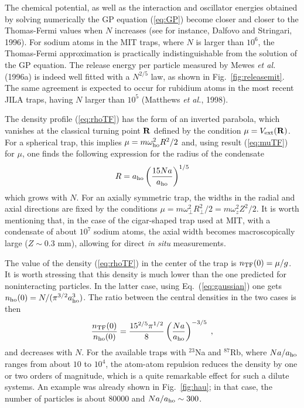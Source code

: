 The chemical potential, as well as the interaction and oscillator
energies obtained by solving numerically the GP equation (\ref{eq:GP})
become closer and closer to the Thomas-Fermi values when $N$
increases (see for instance, Dalfovo and Stringari, 1996). For 
sodium atoms in the MIT traps, where $N$ is larger than $10^6$,
the Thomas-Fermi approximation is practically indistinguishable
from the solution of the GP equation. The release energy per 
particle measured by Mewes {\it et al.} (1996a) is indeed well 
fitted with a $N^{2/5}$ law, as shown in Fig.~\ref{fig:releasemit}. 
The same agreement is expected to occur for rubidium atoms in the 
most recent JILA traps, having $N$ larger than $10^5$ (Matthews 
{\it et al.}, 1998). 

The density profile (\ref{eq:rhoTF}) has the form of an inverted 
parabola, which vanishes at the classical turning point ${\bf R}$
defined by the condition $\mu=V_{\rm ext}({\bf R})$. For a spherical
trap, this implies $\mu=m \omega_{\rm ho}^2 R^2/2$ and, using result
(\ref{eq:muTF}) for $\mu$, one finds the
following expression for the radius of the condensate
\begin{equation}
R = a_{\rm ho} \left( { 15 N a \over a_{\rm ho} } \right)^{1/5}
\label{eq:capitalr}
\end{equation}
which grows with $N$. For an axially symmetric trap, the widths in
the radial and axial directions are fixed by the conditions
$\mu=m\omega_\perp^2 R_\perp^2/2=m\omega_z^2 Z^2/2$. It is worth
mentioning that, in the case of the cigar-shaped trap used at MIT,
with a condensate of about  $10^7$ sodium atoms, the axial width
becomes  macroscopically large ($Z\sim 0.3$ mm), allowing
for direct {\it in situ} measurements.  

The value of the density (\ref{eq:rhoTF}) in the center of the trap
is $n_{\rm TF} (0) = \mu/g$. It is worth stressing that this density is much
lower than the one predicted for noninteracting particles. In the
latter case, using Eq.~(\ref{eq:gaussian}) one gets $n_{\rm ho}(0)=
N/(\pi^{3/2} a_{\rm ho}^3)$. The ratio between the central densities in
the two cases is then
\begin{equation}
{ n_{\rm TF} (0) \over n_{\rm ho} (0) } = {15^{2/5} \pi^{1/2} \over 8 }
\left( {N a \over a_{\rm ho} } \right)^{-3/5} \; ,
\label{eq:ration0}
\end{equation}
and decreases with $N$. For the available traps
with $^{23}$Na and $^{87}$Rb, where $Na/a_{\rm ho}$ ranges from about
$10$ to $10^4$, the atom-atom repulsion reduces the density by
one or two orders of magnitude, which is a quite remarkable effect
for such a dilute systems. An example was already shown in
Fig.~\ref{fig:hau}; in that case, the number of particles is 
about $80000$ and $Na/a_{\rm ho} \sim 300$.  

